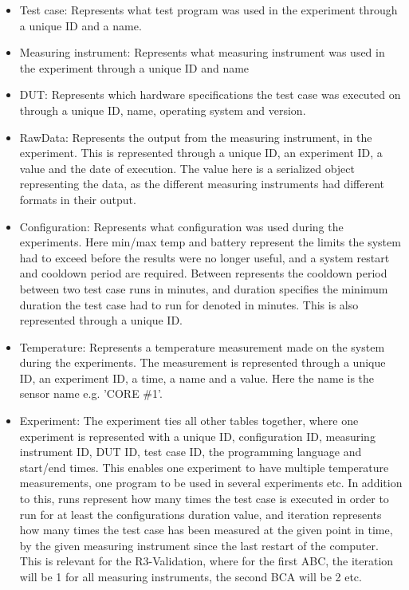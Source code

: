 \begin{itemize}
    \item Test case: Represents what test program was used in the experiment through a unique ID and a name.
    \item Measuring instrument: Represents what measuring instrument was used in the experiment through a unique ID and name
    \item DUT: Represents which hardware specifications the test case was executed on through a unique ID, name, operating system and version. 
    \item RawData: Represents the output from the measuring instrument, in the experiment. This is represented through a unique ID, an experiment ID, a value and the date of execution. The value here is a serialized object representing the data, as the different measuring instruments had different formats in their output.
    \item Configuration: Represents what configuration was used during the experiments. Here min/max temp and battery represent the limits the system had to exceed before the results were no longer useful, and a system restart and cooldown period are required. Between represents the cooldown period between two test case runs in minutes, and duration specifies the minimum duration the test case had to run for denoted in minutes. This is also represented through a unique ID.
    \item Temperature: Represents a temperature measurement made on the system during the experiments. The measurement is represented through a unique ID, an experiment ID, a time, a name and a value. Here the name is the sensor name e.g. 'CORE \#1'.
    \item Experiment: The experiment ties all other tables together, where one experiment is represented with a unique ID, configuration ID, measuring instrument ID, DUT ID, test case ID, the programming language and start/end times. This enables one experiment to have multiple temperature measurements, one program to be used in several experiments etc. In addition to this, runs represent how many times the test case is executed in order to run for at least the configurations duration value, and iteration represents how many times the test case has been measured at the given point in time, by the given measuring instrument since the last restart of the computer. This is relevant for the R3-Validation, where for the first ABC, the iteration will be 1 for all measuring instruments, the second BCA will be 2 etc.
\end{itemize}

